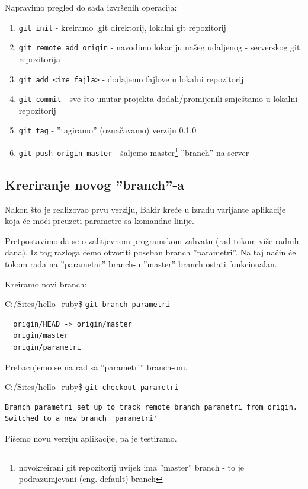 \documentclass[times, utf8, seminar]{fit}
\begin{document}
Napravimo pregled do sada izvršenih operacija:
\begin{enumerate}
  \item \texttt{git init} - kreiramo .git direktorij, lokalni git repozitorij
  \item \texttt{git remote add origin} - navodimo lokaciju našeg udaljenog - serverskog git repozitorija 
  \item \texttt{git add <ime fajla>} - dodajemo fajlove u lokalni repozitorij
  \item \texttt{git commit} - sve što unutar projekta dodali/promijenili smještamo u lokalni repozitorij
  \item \texttt{git tag} - ''tagiramo'' (označavamo) verziju 0.1.0
  \item \texttt{git push origin master} - šaljemo master\footnote{novokreirani git repozitorij uvijek ima ''master'' branch - to je podrazumjevani (eng. default) branch} ''branch'' na server 
\end{enumerate}

\subsection{Kreriranje novog ''branch''-a}

Nakon što je realizovao prvu verziju, Bakir kreće u izradu varijante aplikacije koja će moći preuzeti parametre sa komandne linije.

Pretpostavimo da se o zahtjevnom programskom zahvatu (rad tokom više radnih dana). Iz tog razloga ćemo otvoriti poseban branch ''parametri''.
Na taj način će tokom rada na ''parametar'' branch-u ''master'' branch ostati funkcionalan.


\setlength{\parindent 0cm}
Kreiramo novi branch:

C:/Sites/hello\_ruby\$ \texttt{git branch parametri}
\begin{lstlisting}
  origin/HEAD -> origin/master
  origin/master
  origin/parametri
\end{lstlisting}

Prebacujemo se na rad sa ''parametri'' branch-om.

C:/Sites/hello\_ruby\$ \texttt{git checkout parametri}
\begin{lstlisting}
Branch parametri set up to track remote branch parametri from origin.
Switched to a new branch 'parametri'
\end{lstlisting}

Pišemo novu verziju aplikacije, pa je testiramo.
\end{document}
